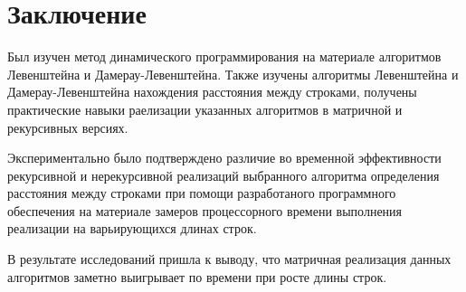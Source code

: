 \documentclass[12pt]{report}
\begin{document}
\chapter*{Заключение}
Был изучен метод динамического программирования на материале алгоритмов Левенштейна и Дамерау-Левенштейна.
Также изучены алгоритмы Левенштейна и Дамерау-Левенштейна нахождения расстояния между строками, получены практические навыки раелизации указанных алгоритмов
в матричной  и рекурсивных версиях. 

Экспериментально было подтверждено различие во временной эффективности рекурсивной и нерекурсивной реализаций выбранного алгоритма определения расстояния между строками при помощи разработаного программного обеспечения на материале замеров процессорного времени выполнения реализации на варьирующихся длинах строк. 

В результате исследований пришла к выводу, что матричная реализация данных алгоритмов заметно выигрывает по времени при росте длины строк.
\end{document}
